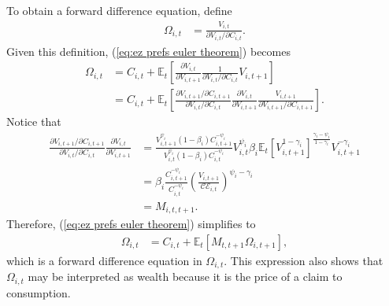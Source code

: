 \documentclass[12 pt, oneside]{article}
\theoremstyle{definition}
\theoremstyle{definition}
\theoremstyle{definition}
\newcommand{\E}{\mathbb{E}}
\newcommand{\calC}{\mathcal{C}}
\newcommand{\calE}{\mathcal{E}}
\begin{document}
To obtain a forward difference equation, define
\begin{align}
  \Omega_{i, t} & = \frac{V_{i, t}}{\partial V_{i, t} /\partial C_{i, t}}.
\end{align}
Given this definition, (\ref{eq:ez prefs euler theorem}) becomes
\begin{align*}
  \Omega_{i, t} & = C_{i, t} + \E_t\left[\frac{\partial V_{i, t}}{\partial V_{i, t + 1}}\frac{1}{\partial V_{i, t} / \partial C_{i, t}}V_{i, t + 1}\right]\\
  & = C_{i, t} + \E_t\left[\frac{\partial V_{i, t + 1} / \partial C_{i, t + 1}}{\partial V_{i, t} / \partial C_{i, t}}\frac{\partial V_{i, t}}{\partial V_{i, t + 1}}\frac{V_{i, t + 1}}{\partial V_{i, t + 1} / \partial C_{i, t + 1}}\right].
\end{align*}
Notice that
\begin{align*}
  \frac{\partial V_{i, t + 1} / \partial C_{i, t + 1}}{\partial V_{i, t} / \partial C_{i, t}} \frac{\partial V_{i, t}}{\partial V_{i, t + 1}} & = \frac{V_{i, t + 1}^{\psi_i} (1 - \beta_i)C_{i, t + 1}^{ - \psi_i}}{V_{i, t}^{\psi_i}(1 - \beta_i) C_{i, t}^{-\psi_i}} V_{i, t}^{\psi_i}\beta_i \E_t[V_{i, t + 1}^{1 - \gamma_i}]^{\frac{\gamma_i - \psi_i}{1 - \gamma_i}}V_{i, t + 1}^{ - \gamma_i}\\
                                                                                                                      & = \beta_i\frac{ C_{i, t + 1}^{ - \psi_i}}{C_{i, t}^{-\psi_i}}\left(\frac{V_{i, t + 1}}{\calC\calE_{i, t}}\right)^{\psi_i - \gamma_i}\\
                                                                                                                      & = M_{i, t, t + 1}.
\end{align*}
Therefore, (\ref{eq:ez prefs euler theorem}) simplifies to
\begin{align}\label{eq:ez prefs euler theorem forward difference}
  \Omega_{i, t} & = C_{i, t} + \E_t[M_{t, t + 1} \Omega_{i, t + 1}],
\end{align}
which is a forward difference equation in $\Omega_{i, t}$. This expression also shows that $\Omega_{i, t}$ may be interpreted as wealth because it is the price of a claim to consumption.
\end{document}
